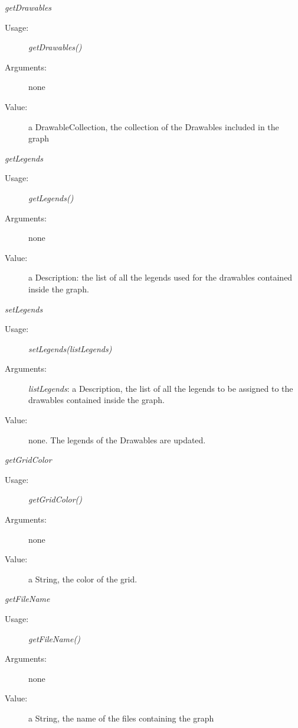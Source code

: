 \begin{description}
\begin{description}
  \item \textit{getDrawables}
    \begin{description}
    \item[Usage:] \textit{getDrawables()}
    \item[Arguments:] none
    \item[Value:] a DrawableCollection, the collection of the Drawables included in the graph
    \end{description}
    \bigskip

  \item \textit{getLegends}
    \begin{description}
    \item[Usage:] \textit{getLegends()}
    \item[Arguments:] none
    \item[Value:] a Description: the list of all the legends used for the drawables contained inside the graph.
    \end{description}
    \bigskip

  \item \textit{setLegends}
    \begin{description}
    \item[Usage:] \textit{setLegends(listLegends)}
    \item[Arguments:]\textit{listLegends}: a Description, the list of all the legends to be assigned to the drawables contained inside the graph.
    \item[Value:] none. The legends of the Drawables are updated.
    \end{description}
    \bigskip

  \item \textit{getGridColor}
    \begin{description}
    \item[Usage:] \textit{getGridColor()}
    \item[Arguments:] none
    \item[Value:] a String, the color of the grid.
    \end{description}
    \bigskip


  \item \textit{getFileName}
    \begin{description}
    \item[Usage:] \textit{getFileName()}
    \item[Arguments:] none
    \item[Value:] a String, the name of the files containing the graph
    \end{description}
    \bigskip


\end{description}
\end{description}
